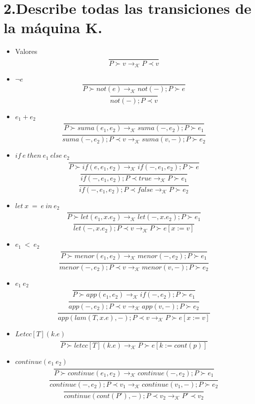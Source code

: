 \documentclass[11pt, a4paper]{report}
\begin{document}
\section*{2.Describe todas las transiciones de la m\'aquina  K.}

	\begin{itemize}
		\item Valores
			$$\frac{}{P \succ v \rightarrow_{\mathcal{K}} P \prec v}  $$
		\item $\neg e$
			$$ \frac{}{P \succ not(e) \rightarrow_{\mathcal{K}} not(-); P \succ e} $$
			$$\frac{}{not(-); P \prec v}$$
		\item $e_{1}+e_{2}$
			$$ \frac{}{P \succ suma(e_{1},e_{2}) \rightarrow_{\mathcal{K}} suma(-,e_{2}); P \succ e_{1}}$$
			$$ \frac{}{suma(-,e_{2});P \prec v \rightarrow_{\mathcal{K}} suma(v,-); P \succ e_{2}}$$
		\item $if\ e\ then\ e_{1}\ else\ e_{2}$
			$$ \frac{}{P \succ if(e,e_{1},e_{2}) \rightarrow_{\mathcal{K}} if(-,e_{1},e_{2}); P \succ e}$$
			$$ \frac{}{if(-,e_{1},e_{2});P \prec true \rightarrow_{\mathcal{K}}  P \succ e_{1}}$$
			$$ \frac{}{if(-,e_{1},e_{2});P \prec false \rightarrow_{\mathcal{K}}  P \succ e_{2}}$$
		\item $let\ x\ =\ e\ in\ e_{2}$
			$$ \frac{}{P \succ let(e_{1},x.e_{2}) \rightarrow_{\mathcal{K}} let(-,x.e_{2});P \succ e_{1} } $$
			$$ \frac{}{let(-,x.e_{2}); P \prec v \rightarrow_{\mathcal{K}} P \succ e[x:=v] } $$
		\item $ e_{1}\ <\ e_{2} $
			$$ \frac{}{P \succ menor(e_{1},e_{2}) \rightarrow_{\mathcal{K}} menor(-,e_{2}); P \succ e_{1}}$$
			$$ \frac{}{menor(-,e_{2});P \prec v \rightarrow_{\mathcal{K}} menor(v,-); P \succ e_{2}}$$
		\item $e_{1}\ e_{2}$
			$$ \frac{}{P \succ app(e_{1},e_{2}) \rightarrow_{\mathcal{K}} if(-,e_{2}); P \succ e_{1}}$$
			$$ \frac{}{app(-,e_{2});P \prec v \rightarrow_{\mathcal{K}}  app(v,-); P \succ e_{2}}$$
			$$ \frac{}{app(lam(T,x.e),-);P \prec v \rightarrow_{\mathcal{K}}  P \succ e[x := v]}$$
		\item $Letcc[T](k.e)$
		$$\frac{}{P \succ letcc[T](k.e) \rightarrow_{\mathcal{K}} P \succ e[k:= cont(p)]}$$	
		\item $continue(e_{1}\ e_{2})$		
			$$ \frac{}{P \succ continue(e_{1},e_{2}) \rightarrow_{\mathcal{K}} continue(-,e_{2}); P \succ e_{1}}$$
			$$ \frac{}{continue(-,e_{2});P \prec v_{1} \rightarrow_{\mathcal{K}} continue(v_{1},-); P \succ e_{2}}$$
			$$\frac{}{continue(cont(P'), -); P \prec v_{2} \rightarrow_{\mathcal{K}} P' \prec v_{2}}$$
	\end{itemize}
\end{document}
